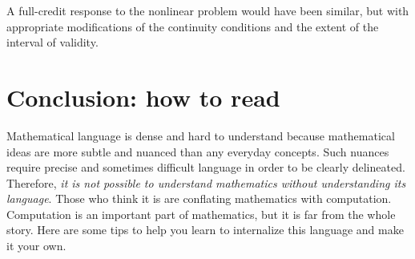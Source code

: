 \documentclass[twocolumn,12pt]{article}
\begin{document}
A full-credit response to the nonlinear problem would have been similar, but with appropriate modifications of the continuity conditions and the extent of the interval of validity.

\section{Conclusion: how to read}
Mathematical language is dense and hard to understand because mathematical ideas are more subtle and nuanced than any everyday concepts. Such nuances require precise and sometimes difficult language in order to be clearly delineated. Therefore, \emph{it is not possible to understand mathematics without understanding its language}. Those who think it is are conflating mathematics with computation. Computation is an important part of mathematics, but it is far from the whole story. Here are some tips to help you learn to internalize this language and make it your own. 
\end{document}
